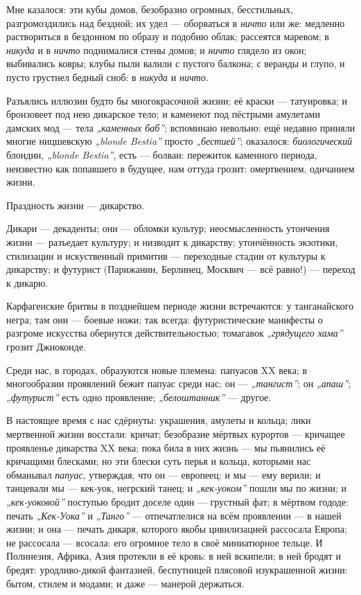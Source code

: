 \documentclass[12pt,a4paper,oneside]{book}
\begin{document}
Мне казалося: эти кубы домов, безобразно огромных, бесстильных, разгромоздились над бездной; их удел — оборваться в \emph{ничто} или же: медленно раствориться в бездонном по образу и подобию облак; рассеятся маревом; в \emph{никуда} и в \emph{ничто} поднималися стены домов; и \emph{ничто} глядело из окон; выбивались ковры; клубы пыли валили с пустого балкона; с веранды и глупо, и пусто грустнел бедный сноб: в \emph{никуда} и \emph{ничто}.

Разъялись иллюзии будто бы многокрасочной жизни; её краски — татуировка; и бронзовеет под нею дикарское тело; и каменеют под пёстрыми амулетами дамских мод — тела \emph{„каменных баб”}; вспоминаю невольно: ещё недавно приняли многие ницшевскую \emph{„blonde Bestia”} просто \emph{„бестией”}; оказалося: \emph{биологический} блондин, \emph{„blonde Bestia”}, есть — болван: пережиток каменного периода, неизвестно как попавшего в будущее, нам оттуда грозит: омертвением, одичанием жизни.

Праздность жизни — дикарство.

Дикари — декаденты; они — обломки культур; неосмысленность утончения жизни — разъедает культуру; и низводит к дикарству; утончённость экзотики, стилизации и искуственный примитив — переходные стадии от культуры к дикарству; и футурист (Парижанин, Берлинец, Москвич — всё равно!) — переход к дикарю.

Карфагенские бритвы в позднейшем периоде жизни встречаются: у танганайского негра; там они — боевые ножи; так всегда: футуристические манифесты о разгроме искусства обернутся действительностью; томагавок \emph{„грядущего хама”} грозит Джиоконде.

Среди нас, в городах, образуются новые племена: папуасов XX века; в многообразии проявлений бежит папуас среди нас; он — \emph{„тангист”}; он \emph{„апаш”}; \emph{„футурист”} есть одно проявление; \emph{„белоштанник”} — другое.

В настоящее время с нас сдёрнуты: украшения, амулеты и кольца; лики мертвенной жизни восстали: кричат; безобразие мёртвых курортов — кричащее проявленье дикарства XX века; пока била в них жизнь — мы пьянились её кричащими блесками; но эти блески суть перья и кольца, которыми нас обманывал \emph{папуас}, утверждая, что он — европеец; и мы — ему верили; и танцевали мы — кек-уок, негрский танец; и \emph{„кек-уоком”} пошли мы по жизни; и \emph{„кек-уоковой”} поступью бродит доселе один — грустный фат; в мёртвом гододе: печать \emph{„Кек-Уока”} и \emph{„Танго”} — отпечатлелися на всём проявлении — в нашей жизни; и она — печать дикаря, которого якобы цивилизацией рассосала Европа; не рассосала — всосала: его огромное тело в своё миниатюрное тельце. И Полинезия, Африка, Азия протекли в её кровь: в ней вскипели; в ней бродят и бредят: уродливо-дикой фантазией, беспутницей плясовой изукрашенной жизни: бытом, стилем и модами; и даже — манерой держаться.
\end{document}
